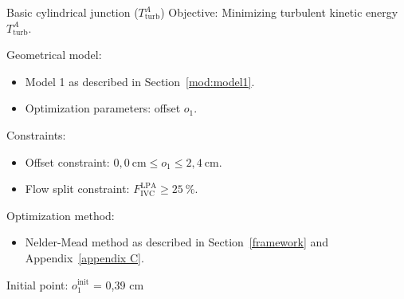 \begin{optimproblem}{Basic cylindrical junction ($T^{A}_{\mathrm{turb}}$)}
	\vspace{2mm}
	Objective: Minimizing turbulent kinetic energy $T^{A}_{\mathrm{turb}}$.
	
	\vspace{2mm}
	Geometrical model:
	\begin{itemize}
		\item Model 1 as described in Section~\ref{mod:model1}.
		\item Optimization parameters: offset $o_1$.
	\end{itemize}
	Constraints:
	\begin{itemize}
		\item Offset constraint: $0{,}0~\text{cm} \leq o_1 \leq 2{,}4~\text{cm}$.
		\item Flow split constraint: $F^{\text{LPA}}_{\text{IVC}} \geq 25~\%$.
	\end{itemize}
	Optimization method:
	\begin{itemize}
		\item Nelder-Mead method as described in Section~\ref{framework} and Appendix~\ref{appendix C}.
	\end{itemize}
	Initial point: $o^{\text{init}}_{1}$ = 0{,}39 cm
	\label{optimprob:2}
\end{optimproblem}
\vspace{-5mm}

